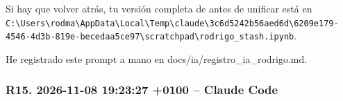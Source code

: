 \documentclass[11pt,a4paper]{article}
\begin{document}
{Si hay que volver atrás, tu versión completa de antes de unificar está en \texttt{C:\textbackslash\allowbreak{}Users\textbackslash\allowbreak{}rodma\textbackslash\allowbreak{}AppData\textbackslash\allowbreak{}Local\textbackslash\allowbreak{}Temp\textbackslash\allowbreak{}claude\textbackslash\allowbreak{}3c6d5242b56aed6d\textbackslash\allowbreak{}6209e179-4546-4d3b-819e-becedaa5ce97\textbackslash\allowbreak{}scratchpad\textbackslash\allowbreak{}rodrigo\_\allowbreak{}stash.ipynb}.

He registrado este prompt a mano en docs/\allowbreak{}ia/\allowbreak{}registro\_\allowbreak{}ia\_\allowbreak{}rodrigo.md.

}

\subsubsection*{R15. 2026-11-08 19:23:27 +0100 -- Claude Code}
\end{document}
